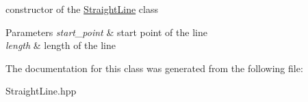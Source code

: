 constructor of the \mbox{\hyperlink{class_path2_d_1_1_straight_line}{Straight\+Line}} class 


\begin{DoxyParams}{Parameters}
{\em start\+\_\+point} & start point of the line \\
\hline
{\em length} & length of the line \\
\hline
\end{DoxyParams}


The documentation for this class was generated from the following file\+:\begin{DoxyCompactItemize}
\item 
Straight\+Line.\+hpp\end{DoxyCompactItemize}
